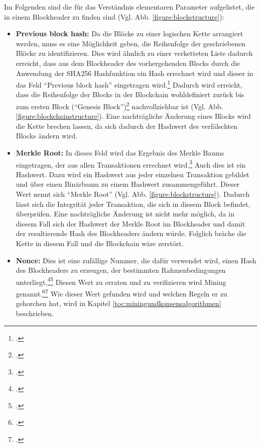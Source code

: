 Im Folgenden sind die für das Verständnis elementaren Parameter aufgelistet, die in einem Blockheader zu finden
sind (Vgl. Abb. \ref{figure:blockstructure}):
\begin{itemize}
    \item \textbf{Previous block hash: }Da die Blöcke zu einer logischen Kette arrangiert werden, muss es eine
    Möglichkeit geben, die Reihenfolge der geschriebenen Blöcke zu identifizieren. Dies wird ähnlich zu einer
    verketteten Liste dadurch erreicht, dass aus dem Blockheader des vorhergehenden Blocks durch die Anwendung der \ac{SHA}256
    Hashfunktion ein Hash errechnet wird und dieser in das Feld "`Previous block hash"' eingetragen
    wird.\footcite[Cf.][p. 4]{nakamoto2008bitcoin} Dadurch wird erreicht,
    dass die Reihenfolge der Blocks in der Blockchain wohldefiniert zurück bis zum ersten Block
    ("`Genesis Block"')\footcite[Cf.][Fig. 3.2]{bhaskar2015bitcoin} nachvollziehbar ist (Vgl. Abb. \ref{figure:blockchainstructure}).
    Eine nachträgliche     Änderung eines Blocks wird die Kette brechen lassen, da sich dadurch der Hashwert des
    verfälschten Blocks ändern wird.
    \item \textbf{Merkle Root: }In dieses Feld wird das Ergebnis des Merkle Baums eingetragen, der aus allen Transaktionen
    errechnet wird.\footcite[Cf.][p. 4]{nakamoto2008bitcoin} Auch dies ist ein Hashwert. Dazu wird ein Hashwert aus
    jeder einzelnen Transaktion gebildet und über einen Binärbaum zu einem Hashwert zusammengeführt. Dieser Wert nennt
    sich "`Merkle Root"' (Vgl. Abb. \ref{figure:blockstructure}). Dadurch lässt sich die Integrität jeder Transaktion,
    die sich in diesem Block befindet, überprüfen. Eine nachträgliche Änderung ist nicht mehr möglich, da in diesem
    Fall sich der Hashwert der Merkle Root im Blockheader und damit der resultierende Hash des Blockheaders ändern würde.
    Folglich bräche die Kette in diesem Fall und die Blockchain wäre zerstört.
    \item \textbf{Nonce: }Dies ist eine zufällige Nummer, die dafür verwendet wird, einen Hash des Blockheaders zu erzeugen,
    der bestimmten Rahmenbedingungen unterliegt.\footcite[Cf.][p. 745]{mukhopadhyay2016brief}\footcite[Cf.][p. 136]{courtois2014optimizing}
    Diesen Wert zu erraten und zu verifizieren wird Mining genannt.\footcite[Cf.][pp. 50]{bhaskar2015bitcoin}\footcite[Cf.][p. 24]{han2019demystifying}
    Wie dieser Wert gefunden wird und welchen Regeln er zu gehorchen hat, wird in Kapitel \ref{toc:miningundkonsensalgorithmen}
    beschrieben.
\end{itemize}

